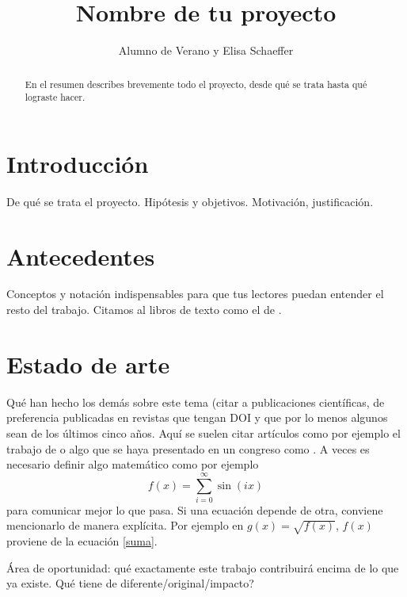 \documentclass{sciposter}
\title{Nombre de tu proyecto}
\author{Alumno de Verano y Elisa Schaeffer}
\institute {Posgrado en Ingeniería de Sistemas}
\begin{document}

\maketitle
\begin{abstract}
En el resumen describes brevemente todo el proyecto, desde qué se trata hasta qué lograste hacer.
\end{abstract}

\begin{multicols}{2} 

\section{Introducción}

De qué se trata el proyecto. Hipótesis y objetivos. Motivación, justificación.

\section{Antecedentes}

Conceptos y notación indispensables para que tus lectores puedan entender el resto del trabajo. Citamos al libros de texto como el de \citet{ai}.

\section{Estado de arte}

Qué han hecho los demás sobre este tema (citar a publicaciones científicas, de preferencia publicadas en revistas que tengan DOI y que por lo menos algunos sean de los últimos cinco años. Aquí se suelen citar artículos como por ejemplo el trabajo de \citet{elisa} o algo que se haya presentado en un congreso como \citet{ar}. A veces es necesario definir algo matemático como por ejemplo
\begin{equation}
    f(x) = \sum_{i = 0}^\infty \sin(i x)
    \label{suma}
\end{equation}
para comunicar mejor lo que pasa. Si una ecuación depende de otra, conviene mencionarlo de manera explícita.
Por ejemplo en $g(x) = \sqrt{f(x)}$, $f(x)$ proviene de la ecuación \eqref{suma}.

Área de oportunidad: qué exactamente este trabajo contribuirá encima de lo que ya existe.  {\textquestiondown}Qué tiene de diferente/original/impacto?


\end{multicols}
\end{document}
